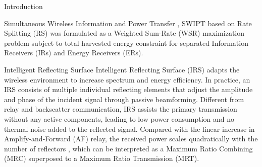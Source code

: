 \documentclass{IEEEtran}
\begin{document}
\begin{section}{Introduction}
\begin{subsection}{Simultaneous Wireless Information and Power Transfer}
\cite{Mao2019}, SWIPT based on Rate Splitting (RS) was formulated as a Weighted Sum-Rate (WSR) maximization problem subject to total harvested energy constraint for separated Information Receivers (IRs) and Energy Receivers (ERs).
	\end{subsection}

	\begin{subsection}{Intelligent Reflecting Surface}
		Intelligent Reflecting Surface (IRS) adapts the wireless environment to increase spectrum and energy efficiency. In practice, an IRS consists of multiple individual reflecting elements that adjust the amplitude and phase of the incident signal through passive beamforming. Different from relay and backscatter communication, IRS assists the primary transmission without any active components, leading to low power consumption and no thermal noise added to the reflected signal. Compared with the linear increase in Amplify-and-Forward (AF) relay, the received power scales quadratically with the number of reflectors \cite{Wu2019}, which can be interpreted as a Maximum Ratio Combining (MRC) superposed to a Maximum Ratio Transmission (MRT).


\end{subsection}
\end{section}
\end{document}
